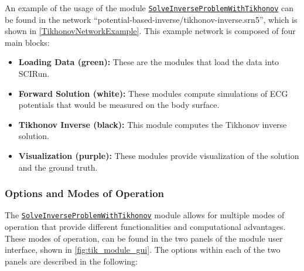     An example of the usage of the module \href{http://scirundocwiki.sci.utah.edu/SCIRunDocs/index.php/CIBC:Documentation:SCIRun:Reference:BioPSE:SolveInverseProblemWithTikhonov}{{\tt SolveInverseProblemWithTikhonov}} can be found in the network ``potential-based-inverse/tikhonov-inverse.srn5'', which is shown in \autoref{TikhonovNetworkExample}.
    This example network is composed of four main blocks:
    \begin{itemize}
        \item {\bf Loading Data (green):} These are the modules that load the data into SCIRun.
        \item {\bf Forward Solution (white):} These modules compute simulations of ECG potentials that would be measured on the body surface.
        \item {\bf Tikhonov Inverse (black):} This module computes the Tikhonov inverse solution.
        \item {\bf Visualization (purple):} These modules provide visualization of the solution and the ground truth.
    \end{itemize}
    
    \subsubsection{Options and Modes of Operation}
    
    The \href{http://scirundocwiki.sci.utah.edu/SCIRunDocs/index.php/CIBC:Documentation:SCIRun:Reference:BioPSE:SolveInverseProblemWithTikhonov}{{\tt SolveInverseProblemWithTikhonov}} module allows for multiple modes of operation that provide different functionalities and computational advantages.
    These modes of operation, can be found in the two panels of the module user interface, shown in \autoref{fig:tik_module_gui}. 
    The options within each of the two panels are described in the following:
    
